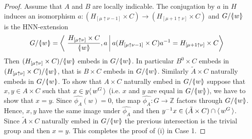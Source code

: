 \documentclass[12pt, a4paper]{amsart}
\theoremstyle{remark}
\theoremstyle{definition}
\begin{document}
\begin{proof}
Assume that $A$ and $B$ are locally indicable. The conjugation by $a$ in $H$ induces an isomorphism  $a\colon (H_{[\mu\uparrow\nu-1]}\times C) \to (H_{[\mu+1\uparrow\nu]}\times C)$ and $G/{{\langle}{\mkern-3.7mu}{\lvert}{\mkern1.2mu}{{w}}{\mkern1.2mu}{\rvert}{\mkern-3.7mu}{\rangle}}$ is the HNN-extension 
\begin{equation}\label{eq:HNNext}
G/{{\langle}{\mkern-3.7mu}{\lvert}{\mkern1.2mu}{{w}}{\mkern1.2mu}{\rvert}{\mkern-3.7mu}{\rangle}}=\left\langle\ \frac{H_{[\mu\uparrow \nu]}\times C}{{{\langle}{\mkern-3.7mu}{\lvert}{\mkern1.2mu}{{w}}{\mkern1.2mu}{\rvert}{\mkern-3.7mu}{\rangle}}}, a\ \vline\ a(H_{[\mu\uparrow\nu-1]}\times C)a^{-1}= H_{[\mu+1\uparrow\nu]}\times C \right\rangle
\end{equation}
Then $(H_{[\mu\uparrow \nu]}\times C)/{{\langle}{\mkern-3.7mu}{\lvert}{\mkern1.2mu}{{w}}{\mkern1.2mu}{\rvert}{\mkern-3.7mu}{\rangle}}$ embeds in $G/{{\langle}{\mkern-3.7mu}{\lvert}{\mkern1.2mu}{{w}}{\mkern1.2mu}{\rvert}{\mkern-3.7mu}{\rangle}}$. In particular  $B^0\times C$ embeds in $(H_{[\mu\uparrow \nu]}\times C)/{{\langle}{\mkern-3.7mu}{\lvert}{\mkern1.2mu}{{w}}{\mkern1.2mu}{\rvert}{\mkern-3.7mu}{\rangle}}$, that is $B\times C$ embeds in $G/{{\langle}{\mkern-3.7mu}{\lvert}{\mkern1.2mu}{{w}}{\mkern1.2mu}{\rvert}{\mkern-3.7mu}{\rangle}}$. Similarly $\widetilde{A}\times C$ naturally embeds in $G/{{\langle}{\mkern-3.7mu}{\lvert}{\mkern1.2mu}{{w}}{\mkern1.2mu}{\rvert}{\mkern-3.7mu}{\rangle}}$. 
To show that $A\times C$ naturally embed in $G/{{\langle}{\mkern-3.7mu}{\lvert}{\mkern1.2mu}{{w}}{\mkern1.2mu}{\rvert}{\mkern-3.7mu}{\rangle}}$ suppose that $x,y\in A \times C$ such that $x\in y{\langle\mkern3mu{w^G}\mkern3mu\rangle}$ (i.e. $x$ and $y$ are equal in $G/{{\langle}{\mkern-3.7mu}{\lvert}{\mkern1.2mu}{{w}}{\mkern1.2mu}{\rvert}{\mkern-3.7mu}{\rangle}}$), we have to show that $x=y$. Since $\widehat{\phi_A}(w)=0$, the map $\widehat{\phi_A}\colon G\to {\mathbb{Z}}$ factors through $G/{{\langle}{\mkern-3.7mu}{\lvert}{\mkern1.2mu}{{w}}{\mkern1.2mu}{\rvert}{\mkern-3.7mu}{\rangle}}$.  Hence, $x,y$ have the same image under $\widehat{\phi_{A}}$ and then $y^{-1}x\in(\tilde{A}\times C)\cap {\langle\mkern3mu{w^{G}}\mkern3mu\rangle}$. Since $\tilde{A}\times C$ naturally embed in $G/{{\langle}{\mkern-3.7mu}{\lvert}{\mkern1.2mu}{{w}}{\mkern1.2mu}{\rvert}{\mkern-3.7mu}{\rangle}}$ the previous intersection is the trivial group and then $x=y$. This completes the proof of (i) in Case 1.


\end{proof}
\end{document}
